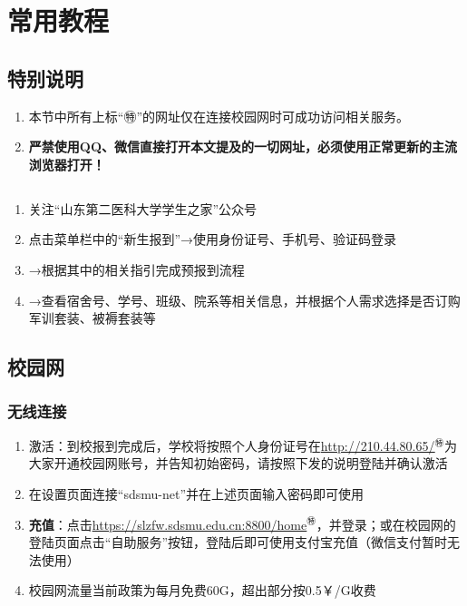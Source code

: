 \section[常用教程]{常用教程}

\subsection*{特别说明}
\begin{enumerate}
    \item 本节中所有上标“㊕”的网址仅在连接校园网时可成功访问相关服务。
    \item \textbf{严禁使用QQ、微信直接打开本文提及的一切网址，必须使用正常更新的主流浏览器打开！}
\end{enumerate}

\subsection[新生信息查询]{}
\label{freshman_query}
\begin{enumerate}
    \item 关注“山东第二医科大学学生之家”公众号
    \item 点击菜单栏中的“新生报到”→使用身份证号、手机号、验证码登录
    \item →根据其中的相关指引完成预报到流程
    \item →查看宿舍号、学号、班级、院系等相关信息，并根据个人需求选择是否订购军训套装、被褥套装\footnotemark 等
\end{enumerate}

\subsection[校园网]{校园网}
\subsubsection[无线连接]{无线连接}
\label{wifi_register}
\begin{enumerate}
    \item 激活：到校报到完成后，学校将按照个人身份证号在\uline{\href{http://210.44.80.65/}{http://210.44.80.65/}$^㊕$}为大家开通校园网账号，并告知初始密码\footnotemark，请按照下发的说明登陆并确认激活
    \item 在设置页面连接“sdsmu-net”并在上述页面输入密码即可使用
    \item \textbf{充值}：点击\uline{\href{https://slzfw.sdsmu.edu.cn:8800/home/}{https://slzfw.sdsmu.edu.cn:8800/home}$^㊕$}，并登录；或在校园网的登陆页面点击“自助服务”按钮\footnotemark，登陆后即可使用支付宝充值（微信支付暂时无法使用）
    \item 校园网流量当前政策为每月免费60G，超出部分按0.5￥/G收费
\end{enumerate}


